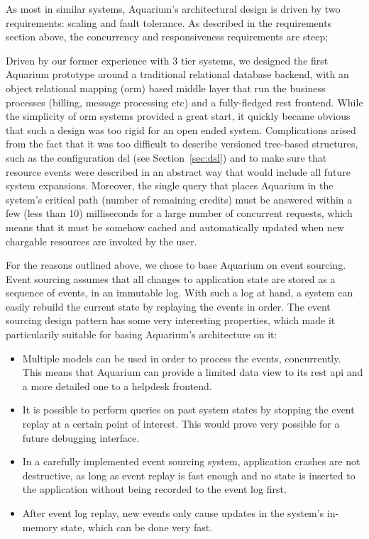 As most in similar systems, Aquarium's architectural design is driven by two 
requirements: scaling and fault tolerance. As described in the requirements
section above, the concurrency and responsiveness requirements are steep;

Driven by our former experience with 3 tier systems, we designed the first
Aquarium prototype around a traditional relational database backend, with an
object relational mapping ({\sc orm}) based middle layer that run the business
processes (billing, message processing etc) and a fully-fledged {\sc rest}
frontend. While the simplicity of {\sc orm} systems provided a great start,
it quickly became obvious that such a design was too rigid for an open 
ended system. Complications arised from the fact that it was too difficult
to describe versioned tree-based structures, such as the configuration {\sc dsl} 
(see Section~\ref{sec:dsl}) and to make sure that resource events were
described in an abstract way that would include all future system expansions.
Moreover, the single query that places Aquarium in the system's critical 
path (number of remaining credits) must be answered within a few (less than
10) milliseconds for a large number of concurrent requests, which means that
it must be somehow cached and automatically updated when new chargable 
resources are invoked by the user.

For the reasons outlined above, we chose to base Aquarium on event sourcing. 
Event sourcing assumes that all changes to application
state are stored as a sequence of events, in an immutable log. With such a log
at hand, a system can easily rebuild the current state by replaying the events
in order. The event sourcing design pattern has some very interesting
properties, which made it particularily suitable for basing Aquarium's
architecture on it:

\begin{itemize}

    \item Multiple models can be used in order to process the events, 
        concurrently. This means that Aquarium can provide a limited
        data view to its {\sc rest api} and a more detailed one to a
        helpdesk frontend.

    \item It is possible to perform queries on past system states by stopping
        the event replay at a certain point of interest. This would prove very
        possible for a future debugging interface.

    \item In a carefully implemented event sourcing system, application crashes 
        are not destructive, as long as event replay is fast enough and no
        state is inserted to the application without being recorded to the event
        log first.

    \item After event log replay, new events only cause updates in the system's
        in-memory state, which can be done very fast.

\end{itemize}

